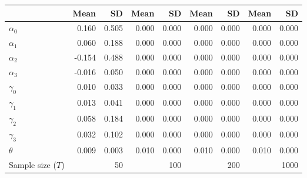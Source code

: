 
\begin{tabular}[t]{lrrrrrrrr}
\toprule
  & Mean & SD & Mean  & SD  & Mean   & SD   & Mean    & SD   \\
\midrule
$\alpha_{0}$ & 0.160 & 0.505 & 0.000 & 0.000 & 0.000 & 0.000 & 0.000 & 0.000\\
$\alpha_{1}$ & 0.060 & 0.188 & 0.000 & 0.000 & 0.000 & 0.000 & 0.000 & 0.000\\
$\alpha_{2}$ & -0.154 & 0.488 & 0.000 & 0.000 & 0.000 & 0.000 & 0.000 & 0.000\\
$\alpha_{3}$ & -0.016 & 0.050 & 0.000 & 0.000 & 0.000 & 0.000 & 0.000 & 0.000\\
$\gamma_{0}$ & 0.010 & 0.033 & 0.000 & 0.000 & 0.000 & 0.000 & 0.000 & 0.000\\
$\gamma_{1}$ & 0.013 & 0.041 & 0.000 & 0.000 & 0.000 & 0.000 & 0.000 & 0.000\\
$\gamma_{2}$ & 0.058 & 0.184 & 0.000 & 0.000 & 0.000 & 0.000 & 0.000 & 0.000\\
$\gamma_{3}$ & 0.032 & 0.102 & 0.000 & 0.000 & 0.000 & 0.000 & 0.000 & 0.000\\
$\theta$ & 0.009 & 0.003 & 0.010 & 0.000 & 0.010 & 0.000 & 0.010 & 0.000\\
Sample size ($T$) &  & 50 &  & 100 &  & 200 &  & 1000\\
\bottomrule
\end{tabular}
